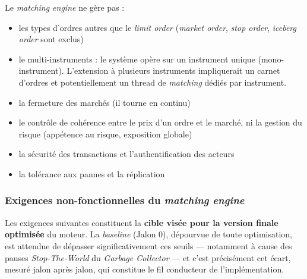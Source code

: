 Le \textit{matching engine} ne gère pas :
\begin{itemize}
    \item les types d'ordres autres que le \textit{limit order} (\textit{market order}, \textit{stop order}, \textit{iceberg order} sont exclus)
    \item le multi-instruments : le système opère sur un instrument unique (mono-instrument). L'extension à plusieurs instruments impliquerait un carnet d'ordres et potentiellement un thread de \textit{matching} dédiés par instrument.
    \item la fermeture des marchés (il tourne en continu)
    \item le contrôle de cohérence entre le prix d'un ordre et le marché, ni la gestion du risque (appétence au risque, exposition globale)
    \item la sécurité des transactions et l'authentification des acteurs
    \item la tolérance aux pannes et la réplication
\end{itemize}

\subsubsection{Exigences non-fonctionnelles du \textit{matching engine}}\label{exigences-nf}
Les exigences suivantes constituent la \textbf{cible visée pour la version finale optimisée} du moteur. La \textit{baseline} (Jalon 0), dépourvue de toute optimisation, est attendue de dépasser significativement ces seuils — notamment à cause des pauses \textit{Stop-The-World} du \textit{Garbage Collector} — et c'est précisément cet écart, mesuré jalon après jalon, qui constitue le fil conducteur de l'implémentation.

